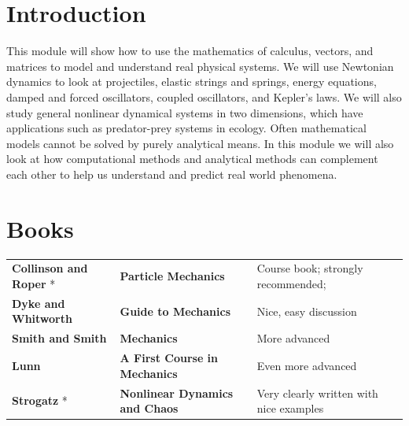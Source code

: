 
\section{Introduction}

This module will show how to use the mathematics of calculus, vectors, and
matrices to model and understand real physical systems. We will use Newtonian
dynamics to look at projectiles, elastic strings and springs, energy equations,
damped and forced oscillators, coupled oscillators, and Kepler's laws. We will
also study general nonlinear dynamical systems in two dimensions, which have
applications such as predator-prey systems in ecology. Often mathematical models
cannot be solved by purely analytical means. In this module we will also look at
how computational methods and analytical methods can complement each other to
help us understand and predict real world phenomena.


\section{Books}

\vspace{0.3cm}

{\small

\begin{tabular}{lp{5cm}p{5.5cm}}
\textbf{Collinson and Roper} * & \textbf{Particle Mechanics}          & Course book; strongly recommended; \\
\textbf{Dyke and Whitworth}    & \textbf{Guide to Mechanics}          & Nice, easy discussion    \\
\textbf{Smith and Smith}       & \textbf{Mechanics}                   & More advanced \\
\textbf{Lunn}                  & \textbf{A First Course in Mechanics} & Even more advanced \\
\textbf{Strogatz} *            & \textbf{Nonlinear Dynamics and Chaos} & Very clearly written with nice examples \\
\end{tabular}

}

